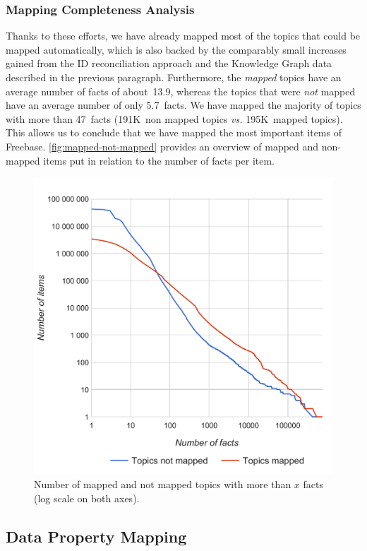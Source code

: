 \documentclass{acm_proc_article-sp}
\begin{document}
\subsubsection{Mapping Completeness Analysis}

Thanks to these efforts, we have already mapped most of the topics that could be mapped automatically,
which is also backed by the comparably small increases gained from the ID reconciliation approach 
and the Knowledge Graph data described in the previous paragraph.
Furthermore, the \emph{mapped} topics have an average number of facts of about~13.9,
whereas the topics that were \emph{not} mapped have an average number of only 5.7~facts.
We have mapped the majority of topics with more than 47~facts
(191K~non mapped topics \textit{vs.} 195K~mapped topics).
This allows us to conclude that we have mapped the most important items of Freebase.
\autoref{fig:mapped-not-mapped} provides an overview of mapped and non-mapped items
put in relation to the number of facts per item.

\begin{figure}[!htbp]
  \centering
  \includegraphics[width=8.45 cm]{img/facts-topics-mapping.pdf}
  \caption{Number of mapped and not mapped topics with more than $x$ facts (log scale on both axes).}
  \label{fig:mapped-not-mapped}
\end{figure}

\subsection{Data Property Mapping}
\end{document}
